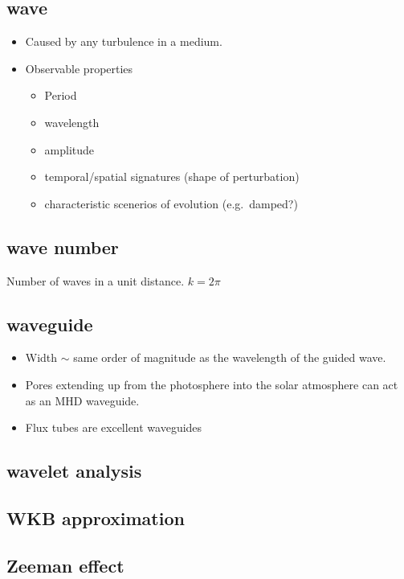\documentclass{article}
\begin{document}
\subsection{wave}
\begin{itemize}
    \item Caused by any turbulence in a medium.
    \item Observable properties
        \begin{itemize}
            \item Period
            \item wavelength
            \item amplitude
            \item temporal/spatial signatures (shape of perturbation)
            \item characteristic scenerios of evolution (e.g.\ damped?)
        \end{itemize}
\end{itemize}

\subsection{wave number}
Number of waves in a unit distance.
${ k = 2\pi }$

\subsection{waveguide}
\begin{itemize}
    \item Width $\sim$ same order of magnitude as the wavelength of
        the guided wave.
    \item Pores extending up from the photosphere
        into the solar atmosphere can act as an
        MHD waveguide.
    \item Flux tubes are excellent waveguides
\end{itemize}

\subsection{wavelet analysis}
\subsection{WKB approximation}
\subsection{Zeeman effect}
\end{document}
